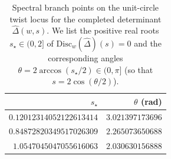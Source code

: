 \begin{table}[H]
\centering
\scriptsize
\setlength{\tabcolsep}{6pt}
\caption{Spectral branch points on the unit-circle twist locus for the completed determinant $\widehat\Delta(w,s)$. We list the positive real roots $s_\star\in(0,2]$ of $\mathrm{Disc}_w(\widehat\Delta)(s)=0$ and the corresponding angles $\theta=2\arccos(s_\star/2)\in(0,\pi]$ (so that $s=2\cos(\theta/2)$).}
\label{tab:sync_kernel_hatdelta_branch_points}
\begin{tabular}{r r}
\toprule
$s_\star$ & $\theta$ (rad)\\
\midrule
$0.12012314052122613414$ & $3.021397173696$\\
$0.84872820349517026309$ & $2.265073650688$\\
$1.0547045047055616063$ & $2.030630156888$\\
\bottomrule
\end{tabular}
\end{table}
